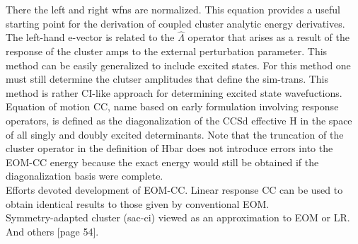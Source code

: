 \documentclass[10pt, draft]{article}
\begin{document}
There the left and right wfns are normalized.  This equation provides a useful starting point for the derivation of coupled cluster analytic energy derivatives.  The left-hand e-vector is related to the $\hat{\Lambda}$ operator that arises as a result of the response of the cluster amps to the external perturbation parameter.  This method can be easily generalized to include excited states.  For this method one must still determine the clutser amplitudes that define the sim-trans. This method is rather CI-like approach for determining excited state wavefuctions.  \\Equation of motion CC, name based on early formulation involving response operators, is defined as the diagonalization of the CCSd effective H in the space of all singly and doubly excited determinants.  Note that the truncation of the cluster operator in the definition of Hbar does not introduce errors into the EOM-CC energy because the exact energy would still be obtained if the diagonalization basis were complete.\\Efforts devoted development of EOM-CC. Linear response CC can be used to obtain identical results to those given by conventional EOM. \\ Symmetry-adapted cluster (sac-ci) viewed as an approximation to EOM or LR.   And others [page 54].


 
\end{document}
